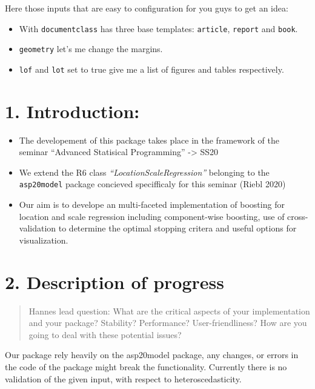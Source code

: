 \documentclass[
]{report}
\providecommand{\tightlist}{%
  \setlength{\itemsep}{0pt}\setlength{\parskip}{0pt}}
\begin{document}
Here those inputs that are easy to configuration for you guys to get an
idea:

\begin{itemize}
\tightlist
\item
  With \texttt{documentclass} has three base templates:
  \texttt{article}, \texttt{report} and \texttt{book}.
\item
  \texttt{geometry} let's me change the margins.
\item
  \texttt{lof} and \texttt{lot} set to true give me a list of figures
  and tables respectively.
\end{itemize}

\hypertarget{introduction}{%
\chapter{1. Introduction:}\label{introduction}}

\begin{itemize}
\tightlist
\item
  The developement of this package takes place in the framework of the
  seminar ``Advanced Statisical Programming'' -\textgreater{} SS20
\item
  We extend the R6 class \emph{``LocationScaleRegression''} belonging to
  the \texttt{asp20model} package concieved specifficaly for this
  seminar (Riebl 2020)
\item
  Our aim is to develope an multi-faceted implementation of boosting for
  location and scale regression including component-wise boosting, use
  of cross-validation to determine the optimal stopping critera and
  useful options for visualization.
\end{itemize}

\hypertarget{description-of-progress}{%
\chapter{2. Description of progress}\label{description-of-progress}}

\begin{quote}
Hannes lead question: What are the critical aspects of your
implementation and your package? Stability? Performance?
User-friendliness? How are you going to deal with these potential
issues?
\end{quote}

Our package rely heavily on the asp20model package, any changes, or
errors in the code of the package might break the functionality.
Currently there is no validation of the given input, with respect to
heteroscedasticity.
\end{document}
